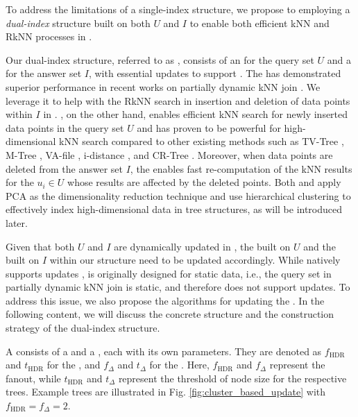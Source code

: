 To address the limitations of a single-index structure, we propose to employing a \emph{dual-index} structure built on both $U$ and $I$ to enable both efficient kNN and RkNN processes in \fdknnj. 


Our dual-index structure, referred to as \dualtree, consists of an \hdrtree \cite{yang2014continuous} for the query set $U$ and a \deltatree \cite{cui2003contorting} for the answer set $I$, with essential updates to support \fdknnj.
%
The \hdrtree has demonstrated superior performance in recent works on partially dynamic kNN join \cite{ukey2022efficient,ukey2023efficient,ukey2023survey,ukey2023knn}. We leverage it to help with the RkNN search in insertion and deletion of data points within $I$ in \fdknnj.
%
\deltatree, on the other hand, enables efficient kNN search for newly inserted data points in the query set $U$ and has proven to be powerful for high-dimensional kNN search compared to other existing methods such as TV-Tree \cite{lin1994tv}, M-Tree \cite{ciaccia1997m}, VA-file \cite{weber1998quantitative}, i-distance \cite{yu2001indexing}, and CR-Tree \cite{kim2001optimizing}.
%
Moreover, when data points are deleted from the answer set $I$, the \deltatree enables fast re-computation of the kNN results for the $u_i\in U$ whose results are affected by the deleted points.
%
Both \hdrtree and \deltatree apply PCA as the dimensionality reduction technique and use hierarchical clustering to effectively index high-dimensional data in tree structures, as will be introduced later.


Given that both $U$ and $I$ are dynamically updated in \fdknnj, the \hdrtree built on $U$ and the \deltatree built on $I$ within our \dualtree structure need to be updated accordingly.
%
While \deltatree natively supports updates \cite{cui2003contorting}, \hdrtree is originally designed for static data, i.e., the query set in partially dynamic kNN join is static, and therefore does not support updates.
%
To address this issue, we also propose the algorithms for updating the \hdrtree.
In the following content, we will discuss the concrete structure and the construction strategy of the dual-index structure. 


%
A \dualtree consists of a \hdrtree and a \deltatree, each with its own parameters.
%
They are denoted as $f_\text{HDR}$ and $t_\text{HDR}$ for the \hdrtree, and $f_\Delta$ and $t_\Delta$ for the \deltatree. 
%
Here, $f_\text{HDR}$ and $f_\Delta$ represent the fanout, while $t_\text{HDR}$ and $t_\Delta$ represent the threshold of node size for the respective trees.
%
Example trees are illustrated in Fig. \ref{fig:cluster_based_update} with $f_\text{HDR}=f_\Delta=2$.

